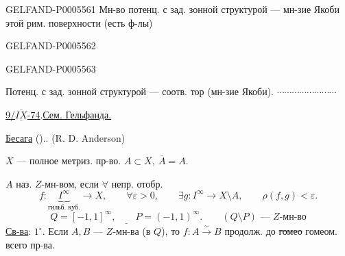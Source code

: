 \begin{GelfandAdjacentEvidence}{GELFAND-P000556}{1}
Мн-во потенц. с зад. зонной структурой — мн-зие Якоби этой рим. поверхности (есть ф-лы)
\end{GelfandAdjacentEvidence}
\begin{GelfandAdjacentEvidence}{GELFAND-P000556}{2}

\end{GelfandAdjacentEvidence}
\begin{GelfandAdjacentEvidence}{GELFAND-P000556}{3}

Потенц. с зад. зонной структурой — соотв. тор (мн-зие Якоби).
\hfill\(\cdots\cdots\cdots\cdots\cdots\cdots\cdots\cdots\)\par

\uline{9/\mbox{$\overline{\underline{IX}}$}-74}\enspace.\qquad\uline{Сем. Гельфанда.}

\uline{Бесага} ().\quad {}.
\hfill (R. D. Anderson)\par
\(X\) — полное метриз. пр-во. \quad \(A\subset X,\ \overline{A}=A\).

\(A\) наз. \(Z\)-мн-вом, если \(\forall\) непр. отобр.
\[
f:\underbrace{I^\infty}_{\text{гильб. куб.}}\longrightarrow X,\qquad
\forall\varepsilon>0,\qquad
\exists g:I^\infty\longrightarrow X\setminus A,\qquad
\rho(f,g)<\varepsilon.
\]
\[
\underline{Q=[-1,1]^\infty,\qquad P=(-1,1)^\infty.}
\qquad(Q\setminus P)\text{ — \(Z\)-мн-во}
\]
\uline{Св-ва}: \(1^\circ\). Если \(A,B\) — \(Z\)-мн-ва (в \(Q\)),
то \(f:A\xrightarrow{\sim} B\) продолж. до \sout{гомео} гомеом. всего пр-ва.
\end{GelfandAdjacentEvidence}
